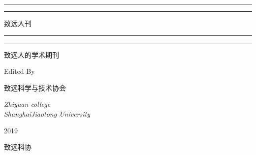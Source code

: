 \begin{titlepage} %
	\centering %
	\scshape %
	\vspace*{\baselineskip} %
	\rule{\textwidth}{1.6pt}\vspace*{-\baselineskip}\vspace*{2pt} %
	\rule{\textwidth}{0.4pt} %
	\vspace{0.75\baselineskip} %
	{\Huge 致远人刊\\} %
	\vspace{0.75\baselineskip} %
	\rule{\textwidth}{0.4pt}\vspace*{-\baselineskip}\vspace{3.2pt} %
	\rule{\textwidth}{1.6pt} %
	\vspace{2\baselineskip} %


	致远人的学术期刊

	\vspace*{3\baselineskip} %


	Edited By

	\vspace{0.5\baselineskip} %

	{\scshape\Large 致远科学与技术协会\\} %

	\vspace{0.5\baselineskip} %
	\textit{Zhiyuan college \\ ShanghaiJiaotong University} %
	\vfill %


	\plogo %

	\vspace{0.3\baselineskip} %

	2019 %

	{\large 致远科协} %

\end{titlepage}









